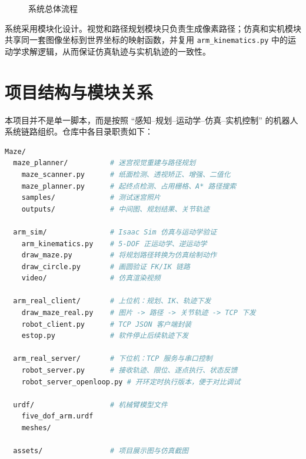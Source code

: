 \documentclass[UTF8,a4paper,12pt]{ctexart}
\begin{document}
\begin{figure}[H]
  \centering
  \caption{系统总体流程}
  \label{fig:pipeline}
\end{figure}

系统采用模块化设计。视觉和路径规划模块只负责生成像素路径；仿真和实机模块共享同一套图像坐标到世界坐标的映射函数，并复用 \texttt{arm\_kinematics.py} 中的运动学求解逻辑，从而保证仿真轨迹与实机轨迹的一致性。

\section{项目结构与模块关系}

本项目并不是单一脚本，而是按照 ``感知--规划--运动学--仿真--实机控制'' 的机器人系统链路组织。仓库中各目录职责如下：

\begin{lstlisting}[language=bash, caption={项目主要目录结构}]
Maze/
  maze_planner/          # 迷宫视觉重建与路径规划
    maze_scanner.py      # 纸面检测、透视矫正、增强、二值化
    maze_planner.py      # 起终点检测、占用栅格、A* 路径搜索
    samples/             # 测试迷宫照片
    outputs/             # 中间图、规划结果、关节轨迹

  arm_sim/               # Isaac Sim 仿真与运动学验证
    arm_kinematics.py    # 5-DOF 正运动学、逆运动学
    draw_maze.py         # 将规划路径转换为仿真绘制动作
    draw_circle.py       # 画圆验证 FK/IK 链路
    video/               # 仿真渲染视频

  arm_real_client/       # 上位机：规划、IK、轨迹下发
    draw_maze_real.py    # 图片 -> 路径 -> 关节轨迹 -> TCP 下发
    robot_client.py      # TCP JSON 客户端封装
    estop.py             # 软件停止后续轨迹下发

  arm_real_server/       # 下位机：TCP 服务与串口控制
    robot_server.py      # 接收轨迹、限位、逐点执行、状态反馈
    robot_server_openloop.py # 开环定时执行版本，便于对比调试

  urdf/                  # 机械臂模型文件
    five_dof_arm.urdf
    meshes/

  assets/                # 项目展示图与仿真截图
\end{lstlisting}
\end{document}
